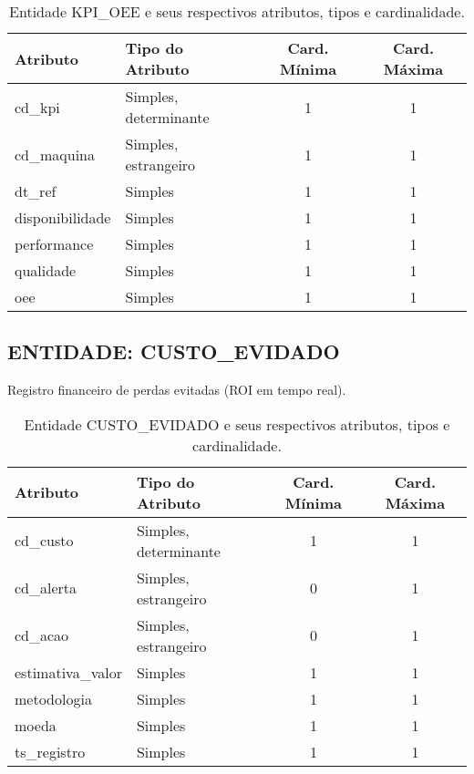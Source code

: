 \documentclass[10pt,a4paper]{article}
\begin{document}
\begin{table}[h!]
\centering
\begin{tabular}{| l | l | c | c |}
\hline
\rowcolor{red}\color{white}\textbf{Atributo} & \color{white}\textbf{Tipo do Atributo} & \color{white}\textbf{Card. Mínima} & \color{white}\textbf{Card. Máxima} \\
\hline
cd\_kpi & Simples, determinante & 1 & 1 \\
cd\_maquina & Simples, estrangeiro & 1 & 1 \\
dt\_ref & Simples & 1 & 1 \\
disponibilidade & Simples & 1 & 1 \\
performance & Simples & 1 & 1 \\
qualidade & Simples & 1 & 1 \\
oee & Simples & 1 & 1 \\
\hline
\end{tabular}
\caption{Entidade KPI\_OEE e seus respectivos atributos, tipos e cardinalidade.}
\label{tab:kpi_oee}
\end{table}

\subsection*{ENTIDADE: CUSTO\_EVIDADO}
Registro financeiro de perdas evitadas (ROI em tempo real).

\begin{table}[h!]
\centering
\begin{tabular}{| l | l | c | c |}
\hline
\rowcolor{red}\color{white}\textbf{Atributo} & \color{white}\textbf{Tipo do Atributo} & \color{white}\textbf{Card. Mínima} & \color{white}\textbf{Card. Máxima} \\
\hline
cd\_custo & Simples, determinante & 1 & 1 \\
cd\_alerta & Simples, estrangeiro & 0 & 1 \\
cd\_acao & Simples, estrangeiro & 0 & 1 \\
estimativa\_valor & Simples & 1 & 1 \\
metodologia & Simples & 1 & 1 \\
moeda & Simples & 1 & 1 \\
ts\_registro & Simples & 1 & 1 \\
\hline
\end{tabular}
\caption{Entidade CUSTO\_EVIDADO e seus respectivos atributos, tipos e cardinalidade.}
\label{tab:custo_evitado}
\end{table}
\end{document}

